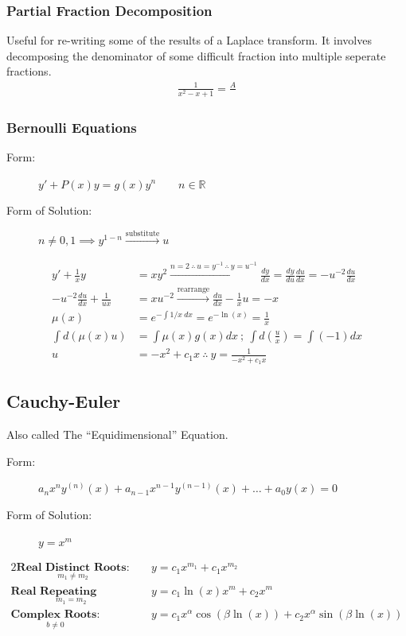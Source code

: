 \subsubsection{Partial Fraction Decomposition}
    Useful for re-writing some of the results of a Laplace transform. It involves decomposing the denominator of some difficult fraction into multiple seperate fractions. 
    \begin{align*}
        \frac{1}{x^2-x+1}=\frac{A}{}
    \end{align*}
\newpage
\subsubsection{Bernoulli Equations}
    \begin{description}
        \item [\rm Form:] $\boxed{\displaystyle y'+P(x)y=g(x)y^n}\qquad n\in\mathbb{R}$
        \item [\rm Form of Solution:] $\boxed{n\neq0,1\implies y^{1-n}\xrightarrow{\text{substitute}}u}$
    \end{description}
    \begin{align*}
        y'+\frac{1}{x}y&=xy^2\xrightarrow{n=2\ \therefore\ u=y^{-1}\ \therefore\ y=u^{-1}} \frac{dy}{dx}=\frac{dy}{du}\frac{du}{dx}=-u^{-2}\frac{du}{dx}\\
        -u^{-2}\frac{du}{dx}+\frac{1}{ux}&=xu^{-2}\xrightarrow{\text{rearrange}}\frac{du}{dx}-\frac{1}{x}u=-x\\
        \mu(x)&=e^{-\int 1/x\ dx}=e^{-\ln(x)}=\frac{1}{x}\\
        \int d(\mu(x)u)&=\int \mu(x)g(x)dx\ ;\ \int d\left(\frac{u}{x}\right)=\int (-1)dx\\
        u&=-x^2+c_1x\ \therefore\ \boxed{y=\frac{1}{-x^2+c_1x}}
        \end{align*}
\subsection*{Cauchy-Euler}
    Also called The ``Equidimensional'' Equation. 
    \begin{description}
        \item [\rm Form:] $\boxed{\displaystyle a_{n}x^{n}y^{(n)}(x)+a_{n-1}x^{n-1}y^{(n-1)}(x)+\dots +a_{0}y(x)=0}$
        \item [\rm Form of Solution:] $\boxed{y=x^m}$
    \end{description}
    
    \begin{alignat}{2}
        \underset { m_1 \neq m_2}{\textbf{Real Distinct Roots:}}
        &\quad y=c_1x^{m_1}+c_1x^{m_2}\\[0.7 cm]
        \underset{m_1=m_2}{\textbf{Real Repeating Roots:}}
        &\quad y=c_1\ln(x)x^m+c_2x^m\\[0.7 cm]
        \underset{b \neq 0}{\textbf{Complex Roots:}}
        &\quad y=c_{1}x^{\alpha }\cos(\beta \ln(x))+c_{2}x^{\alpha }\sin(\beta \ln(x))
    \end{alignat}
    \newpage
